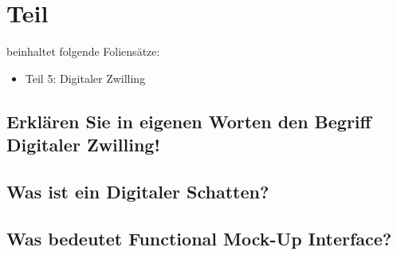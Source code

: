 \section{Teil}
beinhaltet folgende Foliensätze:

\begin{itemize}
    \item Teil 5: Digitaler Zwilling

\end{itemize}

\subsection{Erklären Sie in eigenen Worten den Begriff Digitaler Zwilling!}


\subsection{Was ist ein Digitaler Schatten?}


\subsection{Was bedeutet Functional Mock-Up Interface?}